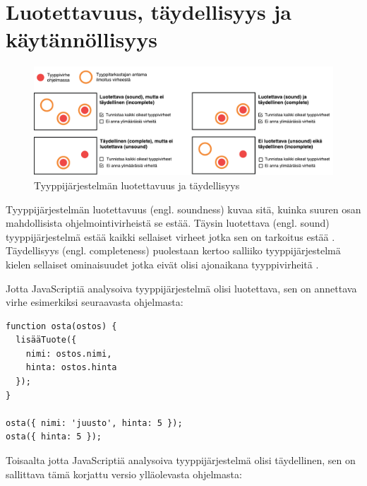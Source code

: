\section{Luotettavuus, täydellisyys ja käytännöllisyys}
\begin{figure}[!htb]
\includegraphics[width=\textwidth]{images/soundness_completeness2.pdf}
\caption{Tyyppijärjestelmän luotettavuus ja täydellisyys}
\end{figure}
Tyyppijärjestelmän luotettavuus (engl. soundness) kuvaa sitä, kuinka suuren osan
mahdollisista ohjelmointivirheistä se estää. Täysin luotettava (engl. sound)
tyyppijärjestelmä estää kaikki sellaiset virheet jotka sen on tarkoitus
estää \cite{CSE_ProgrammingLanguages}. Täydellisyys (engl. \mbox{completeness})
puolestaan kertoo salliiko tyyppijärjestelmä kielen sellaiset ominaisuudet
jotka eivät olisi ajonaikana tyyppivirheitä \cite{TypesAndProgrammingLanguages, CSE_ProgrammingLanguages}.

Jotta JavaScriptiä analysoiva tyyppijärjestelmä olisi luotettava, sen on
annettava virhe esimerkiksi seuraavasta ohjelmasta:

\begin{minipage}{\linewidth}
\begin{lstlisting}[caption={Virheellinen JavaScript-ohjelma: lisätyllä tuotteella ei ole nimeä.},label={fig:soundness_test}]
function osta(ostos) {
  lisääTuote({
    nimi: ostos.nimi,
    hinta: ostos.hinta
  });
}

osta({ nimi: 'juusto', hinta: 5 });
osta({ hinta: 5 });
\end{lstlisting}
\end{minipage}

Toisaalta jotta JavaScriptiä analysoiva tyyppijärjestelmä olisi täydellinen,
sen on sallittava tämä korjattu versio ylläolevasta ohjelmasta:

